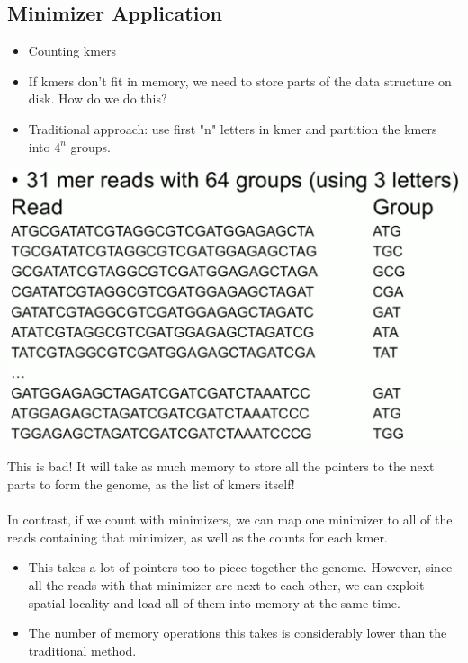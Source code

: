\documentclass[10pt]{article}
\begin{document}
\subsection*{Minimizer Application}
\begin{itemize}
    \item Counting kmers
    \item If kmers don't fit in memory, we need to store parts of the data structure on disk.  How do we do this?
    \item Traditional approach: use first "n" letters in kmer and partition the kmers into $4^n$ groups.
\end{itemize}
\begin{center}
    \includegraphics*[width=\textwidth]{W2_5.png}
\end{center}
This is bad!  It will take as much memory to store all the pointers to the next parts to form the genome, as the list of kmers itself!\\\\
In contrast, if we count with minimizers, we can map one minimizer to all of the reads containing that minimizer, as well as the counts for each kmer.  
\begin{itemize}
    \item This takes a lot of pointers too to piece together the genome.  However, since all the reads with that minimizer are next to each other, we can exploit spatial locality and load all of them into memory at the same time.
    \item The number of memory operations this takes is considerably lower than the traditional method.
\end{itemize}
\end{document}
